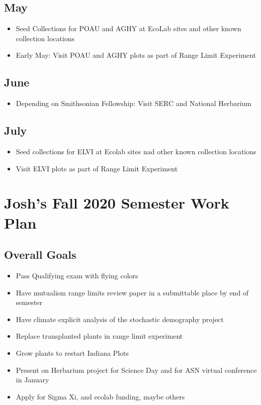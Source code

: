 \documentclass{article}
\begin{document}
\subsection*{May}
\begin{itemize}
\item{Seed Collections for POAU and AGHY at EcoLab sites and other known collection locations}
\item{Early May: Visit POAU and AGHY plots as part of Range Limit Experiment}
\end{itemize}

\subsection*{June}
\begin{itemize}
\item{Depending on Smithsonian Fellowship: Visit SERC and National Herbarium}
\end{itemize}

\subsection*{July}
\begin{itemize}
\item{Seed collections for ELVI at Ecolab sites nad other known collection locations}
\item{Visit ELVI plots as part of Range Limit Experiment}
\end{itemize}

\section*{Josh's Fall 2020 Semester Work Plan}
\subsection*{Overall Goals}
\begin{itemize}
\item{Pass Qualifying exam with flying colors}
\item{Have mutualism range limits review paper in a submittable place by end of semester}
\item{Have climate explicit analysis of the stochastic demography project}
\item{Replace transplanted plants in range limit experiment}
\item{Grow plants to restart Indiana Plots}
\item{Present on Herbarium project for Science Day and for ASN virtual conference in January}
\item{Apply for Sigma Xi, and ecolab funding, maybe others}
\end{itemize}
\end{document}
